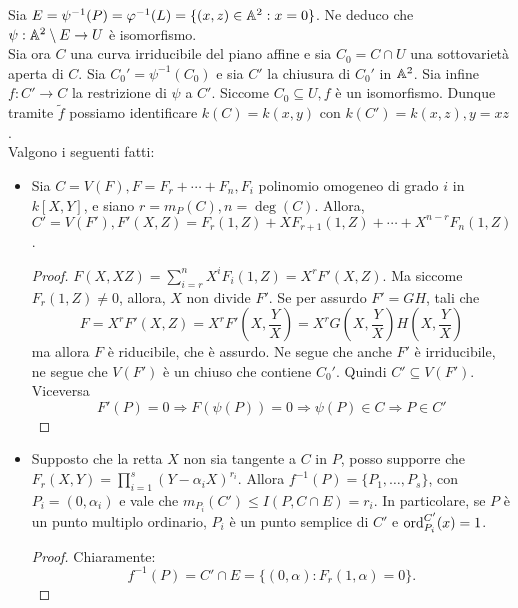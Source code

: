     Sia $E = \psi^{-1}(P) = \varphi^{-1}(L) = \{(x,z) \in \mathbb{A}^2 : x = 0\}$. Ne deduco che $\psi : \mathbb{A}^2 \setminus E \to U$ è isomorfismo.\\
    Sia ora $C$ una curva irriducibile del piano affine e sia $C_0 = C \cap U$ una sottovarietà aperta di $C$. Sia $C_0' = \psi^{-1}(C_0)$ e sia $C'$ la chiusura di $C_0'$ in $\mathbb{A}^2$. Sia infine $f : C' \to C$ la restrizione di $\psi$ a $C'$. Siccome $C_0 \subseteq U, f$ è un isomorfismo. 
    Dunque tramite $\tilde{f}$ possiamo identificare $k(C) = k(x,y)$ con $k(C') = k(x,z), y = xz$. \\
    Valgono i seguenti fatti: \begin{itemize}
        \item Sia $C = V(F), F = F_r + \cdots + F_n, F_i$ polinomio omogeneo di grado $i$ in $k[X,Y]$, e siano $r = m_P(C), n = \deg(C)$. Allora, $C' = V(F'), F'(X,Z) = F_r(1,Z) + XF_{r+1}(1,Z) + \cdots + X^{n-r}F_n(1,Z)$.
        \begin{proof}
                $F(X,XZ) = \sum_{i=r}^n X^i F_i(1,Z) = X^r F'(X,Z)$. Ma siccome $F_r(1,Z) \neq 0$, allora, $X$ non divide $F'$. Se per assurdo $F' = GH$, tali che \begin{equation*}
                    F = X^r F'(X,Z) = X^r F' \left( X,\frac{Y}{X} \right) = X^r G \left( X, \frac{Y}{X} \right) H \left( X, \frac{Y}{X} \right)
                \end{equation*}
                ma allora $F$ è riducibile, che è assurdo. Ne segue che anche $F'$ è irriducibile, ne segue che $V(F')$ è un chiuso che contiene $C_0'$. Quindi $C' \subseteq V(F')$. \\
                Viceversa \begin{equation*}
                    F'(P) = 0 \Longrightarrow F(\psi(P)) = 0 \Longrightarrow \psi(P) \in C \Longrightarrow P \in C'
                \end{equation*} 
        \end{proof}
        \item Supposto che la retta $X$ non sia tangente a $C$ in $P$, posso supporre che $F_r(X,Y) = \prod_{i=1}^s (Y-\alpha_iX)^{r_i}$. Allora $f^{-1}(P) = \{P_1,\ldots,P_s\}$, con $P_i = (0,\alpha_i)$ e vale che $m_{P_i}(C') \leq I(P,C \cap E) = r_i$. In particolare, se $P$ è un punto multiplo ordinario, 
        $P_i$ è un punto semplice di $C'$ e $\text{ord}_{P_i}^{C'}(x) = 1$.
        \begin{proof}
            Chiaramente: \begin{equation*}
                f^{-1}(P) = C' \cap E = \{(0,\alpha) : F_r(1,\alpha) = 0\}.

\end{equation*}
\end{proof}
\end{itemize}
